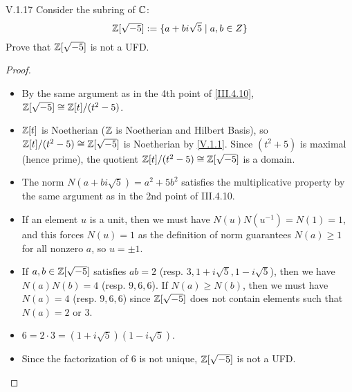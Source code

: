 \begin{problem}{V.1.17}
    Consider the subring of $\mathbb{C}$:
    \[
    \mathbb{Z}[\sqrt{-5}] := \{a+bi\sqrt{5} \; | \; a,b\in Z\}	
    \]
    Prove that $\mathbb{Z}[\sqrt{-5}]$ is not a UFD.
\end{problem}
\begin{proof} \
\begin{itemize}
    \setlength\itemsep{0pt}
    \item By the same argument as in the 4th point of \ref{III.4.10}, $\mathbb{Z}[\sqrt{-5}] \cong \mathbb{Z}[t]/(t^2-5)$.
    \item $\mathbb{Z}[t]$ is Noetherian ($\mathbb{Z}$ is Noetherian and Hilbert Basis), so $\mathbb{Z}[t]/(t^2-5) \cong \mathbb{Z}[\sqrt{-5}]$ is Noetherian by \ref{V.1.1}. Since $(t^2 + 5)$ is maximal (hence prime), the quotient $\mathbb{Z}[t]/(t^2-5) \cong \mathbb{Z}[\sqrt{-5}]$ is a domain.
    \item The norm $N(a+bi\sqrt{5}) = a^2 + 5b^2$ satisfies the multiplicative property by the same argument as in the 2nd point of III.4.10.
    \item If an element $u$ is a unit, then we must have $N(u)N(u^{-1}) = N(1) = 1$, and this forces $N(u) = 1$ as the definition of norm guarantees $N(a) \geq 1$ for all nonzero $a$, so $u = \pm 1 $.
    \item If $a, b \in \mathbb{Z}[\sqrt{-5}]$ satisfies $ab = 2$ (resp. $3, 1+i\sqrt{5}, 1-i\sqrt{5}$), then we have $N(a)N(b) = 4$ (resp. $9,6,6$). If $N(a) \geq N(b)$, then we must have $N(a) = 4$ (resp. $9,6,6$) since $\mathbb{Z}[\sqrt{-5}]$ does not contain elements such that $N(a) = 2 \text{ or } 3$.
    \item $6 = 2 \cdot 3 = (1 + i \sqrt{5}) (1 - i \sqrt{5})$.
    \item Since the factorization of $6$ is not unique, $\mathbb{Z}[\sqrt{-5}]$ is not a UFD.
\end{itemize}
\end{proof}

\section{}

